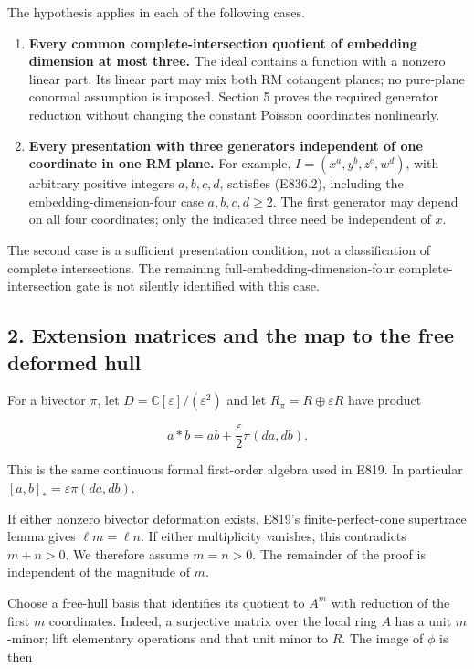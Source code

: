 The hypothesis applies in each of the following cases.

\begin{enumerate}
\def\labelenumi{\arabic{enumi}.}
\tightlist
\item
  \textbf{Every common complete-intersection quotient of embedding
  dimension at most three.} The ideal contains a function with a nonzero
  linear part. Its linear part may mix both RM cotangent planes; no
  pure-plane conormal assumption is imposed. Section 5 proves the
  required generator reduction without changing the constant Poisson
  coordinates nonlinearly.
\item
  \textbf{Every presentation with three generators independent of one
  coordinate in one RM plane.} For example, \(I=(x^a,y^b,z^c,w^d)\),
  with arbitrary positive integers \(a,b,c,d\), satisfies (E836.2),
  including the embedding-dimension-four case \(a,b,c,d\ge2\). The first
  generator may depend on all four coordinates; only the indicated three
  need be independent of \(x\).
\end{enumerate}

The second case is a sufficient presentation condition, not a
classification of complete intersections. The remaining
full-embedding-dimension-four complete-intersection gate is not silently
identified with this case.

\subsection{2. Extension matrices and the map to the free deformed
hull}\label{extension-matrices-and-the-map-to-the-free-deformed-hull}

For a bivector \(\pi\), let \(D=\mathbb C[\varepsilon]/(\varepsilon^2)\)
and let \(R_\pi=R\oplus\varepsilon R\) have product

\[
 a*b=ab+\frac{\varepsilon}{2}\pi(da,db).
 \tag{E836.4}
\]

This is the same continuous formal first-order algebra used in E819. In
particular \([a,b]_* =\varepsilon\pi(da,db)\).

If either nonzero bivector deformation exists, E819's
finite-perfect-cone supertrace lemma gives \(\ell m=\ell n\). If either
multiplicity vanishes, this contradicts \(m+n>0\). We therefore assume
\(m=n>0\). The remainder of the proof is independent of the magnitude of
\(m\).

Choose a free-hull basis that identifies its quotient to \(A^m\) with
reduction of the first \(m\) coordinates. Indeed, a surjective matrix
over the local ring \(A\) has a unit \(m\)-minor; lift elementary
operations and that unit minor to \(R\). The image of \(\phi\) is then

